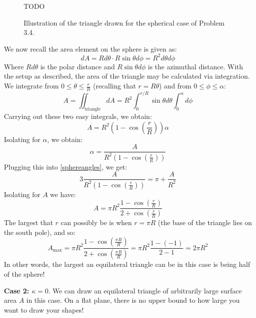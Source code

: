 \begin{figure}[htbp]
    \centering
    TODO
    \caption{Illustration of the triangle drawn for the spherical case of Problem 3.4.}
    \label{fig3.4}
\end{figure}

\noindent We now recall the area element on the sphere is given as:
\begin{equation}
    dA = R d\theta \cdot R \sin\theta d\phi = R^2 d\theta d\phi 
\end{equation}
Where $Rd\theta$ is the polar distance and $R\sin\theta d\phi$ is the azimuthal distance. With the setup as described, the area of the triangle may be calculated via integration. We integrate from $0 \leq \theta \leq \frac{r}{R}$ (recalling that $r = R\theta$) and from $0 \leq \phi \leq \alpha$:
\begin{equation}
    A = \iint_{\text{triangle}} dA = R^2 \int_{0}^{r/R} \sin\theta d\theta \int_{0}^{\alpha} d\phi 
\end{equation}
Carrying out these two easy integrals, we obtain:
\begin{equation}
    A = R^2 \left(1 - \cos(\frac{r}{R})\right)\alpha
\end{equation}
Isolating for $\alpha$, we obtain:
\begin{equation}
    \alpha = \frac{A}{R^2\left(1 - \cos(\frac{r}{R})\right)}
\end{equation}
Plugging this into \eqref{sphereangles}, we get:
\begin{equation}
    3\frac{A}{R^2\left(1 - \cos(\frac{r}{R})\right)} = \pi + \frac{A}{R^2}
\end{equation}
Isolating for $A$ we have:
\begin{equation}
    A = \pi R^2 \frac{1 - \cos(\frac{r}{R})}{2 + \cos(\frac{r}{R}) }
\end{equation}
The largest that $r$ can possibly be is when $r = \pi R$ (the base of the triangle lies on the south pole), and so:
\begin{equation}
    \boxed{A_{\text{max}} = \pi R^2 \frac{1 - \cos(\frac{\pi R}{R})}{2 + \cos(\frac{\pi R}{R}) } = \pi R^2 \frac{1 - (-1)}{2 - 1} = 2\pi R^2}
\end{equation}
In other words, the largest an equilateral triangle can be in this case is being half of the sphere!

\noindent \textbf{Case 2: $\kappa = 0$}. We can draw an equilateral triangle of arbitrarily large surface area $A$ in this case. On a flat plane, there is no upper bound to how large you want to draw your shapes!

